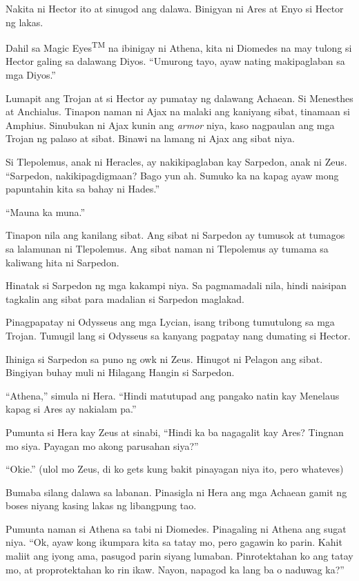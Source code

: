 \documentclass[12pt,letterpaper]{report}
\begin{document}
Nakita ni Hector ito at sinugod ang dalawa. Binigyan ni Ares at Enyo si Hector ng lakas.

Dahil sa Magic Eyes\textsuperscript{TM} na ibinigay ni Athena, kita ni Diomedes na may tulong si Hector galing sa dalawang Diyos. ``Umurong tayo, ayaw nating makipaglaban sa mga Diyos.''

Lumapit ang Trojan at si Hector ay pumatay ng dalawang Achaean. Si Menesthes at Anchialus. Tinapon naman ni Ajax na malaki ang kaniyang sibat, tinamaan si Amphius. Sinubukan ni Ajax kunin ang \textit{armor} niya, kaso nagpaulan ang mga Trojan ng palaso at sibat. Binawi na lamang ni Ajax ang sibat niya.

Si Tlepolemus, anak ni Heracles, ay nakikipaglaban kay Sarpedon, anak ni Zeus. ``Sarpedon, nakikipagdigmaan? Bago yun ah. Sumuko ka na kapag ayaw mong papuntahin kita sa bahay ni Hades.''

``Mauna ka muna.''

Tinapon nila ang kanilang sibat. Ang sibat ni Sarpedon ay tumusok at tumagos sa lalamunan ni Tlepolemus. Ang sibat naman ni Tlepolemus ay tumama sa kaliwang hita ni Sarpedon.

Hinatak si Sarpedon ng mga kakampi niya. Sa pagmamadali nila, hindi naisipan tagkalin ang sibat para madalian si Sarpedon maglakad.

Pinagpapatay ni Odysseus ang mga Lycian, isang tribong tumutulong sa mga Trojan. Tumugil lang si Odysseus sa kanyang pagpatay nang dumating si Hector.

Ihiniga si Sarpedon sa puno ng owk ni Zeus. Hinugot ni Pelagon ang sibat. Bingiyan buhay muli ni Hilagang Hangin si Sarpedon.

``Athena,'' simula ni Hera. ``Hindi matutupad ang pangako natin kay Menelaus kapag si Ares ay nakialam pa.''

Pumunta si Hera kay Zeus at sinabi, ``Hindi ka ba nagagalit kay Ares? Tingnan mo siya. Payagan mo akong parusahan siya?''

``Okie.'' (ulol mo Zeus, di ko gets kung bakit pinayagan niya ito, pero whateves)

Bumaba silang dalawa sa labanan. Pinasigla ni Hera ang mga Achaean gamit ng boses niyang kasing lakas ng libangpung tao.

Pumunta naman si Athena sa tabi ni Diomedes. Pinagaling ni Athena ang sugat niya. ``Ok, ayaw kong ikumpara kita sa tatay mo, pero gagawin ko parin. Kahit maliit ang iyong ama, pasugod parin siyang lumaban. Pinrotektahan ko ang tatay mo, at proprotektahan ko rin ikaw. Nayon, napagod ka lang ba o naduwag ka?''
\end{document}

